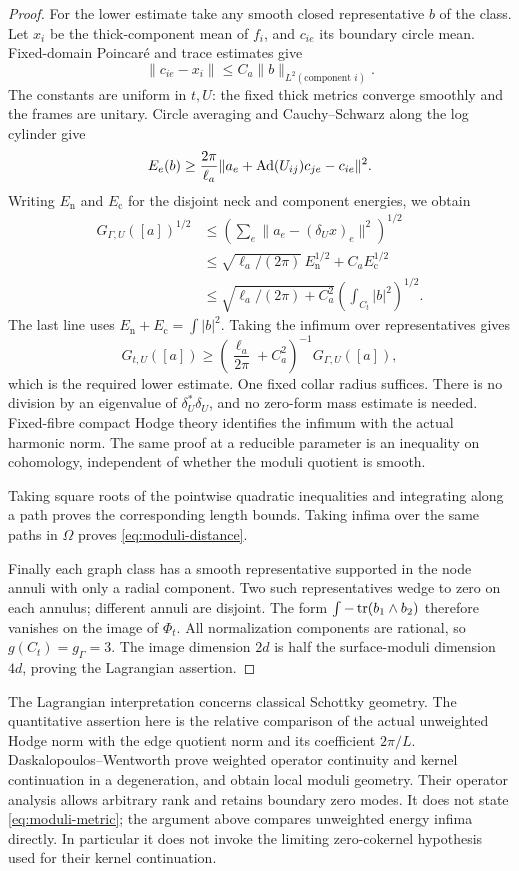 \begin{proof}
For the lower estimate take any smooth
closed representative $b$ of the class.
Let $x_i$ be the thick-component mean
of $f_i$, and $c_{ie}$ its boundary
circle mean. Fixed-domain Poincaré
and trace estimates give
\[
 \|c_{ie}-x_i\|
       \le C_a\|b\|_{L^2(\text{component }i)}.
\]
The constants are uniform in $t,U$:
the fixed thick metrics converge
smoothly and the frames are unitary.
Circle averaging and Cauchy--Schwarz
along the log cylinder give
\[
 E_e(b)\ge\frac{2\pi}{\ell_a}
       \|a_e+\operatorname{Ad}(U_{ij})c_{je}-c_{ie}\|^2 .
\]
Writing $E_{\mathrm n}$ and
$E_{\mathrm c}$ for the disjoint
neck and component energies, we obtain
\[
 \begin{split}
 G_{\Gamma,U}([a])^{1/2}
 &\le\left(\sum_e\|a_e-(\delta_Ux)_e\|^2\right)^{1/2}\\
 &\le\sqrt{\ell_a/(2\pi)}\,E_{\mathrm n}^{1/2}
                                  +C_aE_{\mathrm c}^{1/2}\\
 &\le\sqrt{\ell_a/(2\pi)+C_a^2}
                            \left(\int_{C_t}|b|^2\right)^{1/2}.
 \end{split}
\]
The last line uses $E_{\mathrm n}+E_{\mathrm c}
=\int|b|^2$. Taking the infimum over
representatives gives
\[
 G_{t,U}([a])
 \ge\left(\frac{\ell_a}{2\pi}+C_a^2\right)^{-1}
                                        G_{\Gamma,U}([a]),
\]
which is the required lower estimate.
One fixed collar radius suffices.
There is no division by an eigenvalue
of $\delta_U^*\delta_U$, and no
zero-form mass estimate is needed.
Fixed-fibre compact Hodge theory
identifies the infimum with the actual
harmonic norm. The same proof at a
reducible parameter is an inequality
on cohomology, independent of whether
the moduli quotient is smooth.

Taking square roots of the pointwise
quadratic inequalities and integrating
along a path proves the corresponding
length bounds. Taking infima over the
same paths in $\Omega$ proves
\eqref{eq:moduli-distance}.

Finally each graph class has a smooth
representative supported in the node
annuli with only a radial component.
Two such representatives wedge to
zero on each annulus; different
annuli are disjoint. The form
$\int-\operatorname{tr}(b_1\wedge b_2)$ therefore
vanishes on the image of $\Phi_t$.
All normalization components are
rational, so $g(C_t)=g_\Gamma=3$.
The image dimension $2d$ is half
the surface-moduli dimension $4d$,
proving the Lagrangian assertion.
\end{proof}

The Lagrangian interpretation concerns
classical Schottky geometry. The
quantitative assertion here is the
relative comparison of the actual
unweighted Hodge norm with the edge
quotient norm and its coefficient
$2\pi/L$.
Daskalopoulos--Wentworth
\cite[Proposition~3.23 and Corollary~3.24]{dw-local}
prove weighted operator continuity and
kernel continuation in a degeneration,
and obtain local moduli geometry.
Their operator analysis allows
arbitrary rank and retains boundary
zero modes. It does not state
\eqref{eq:moduli-metric}; the argument
above compares unweighted energy
infima directly. In particular it
does not invoke the limiting
zero-cokernel hypothesis used for
their kernel continuation.

